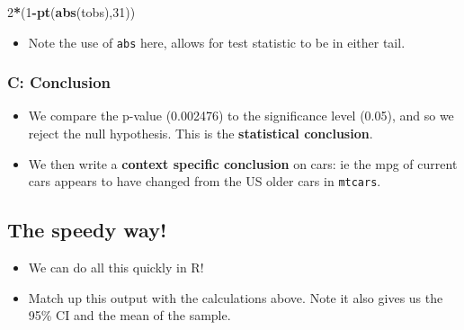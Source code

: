\documentclass[]{article}
\newenvironment{Shaded}{\begin{snugshade}}{\end{snugshade}}
\newcommand{\DataTypeTok}[1]{\textcolor[rgb]{0.13,0.29,0.53}{#1}}
\newcommand{\DecValTok}[1]{\textcolor[rgb]{0.00,0.00,0.81}{#1}}
\newcommand{\FloatTok}[1]{\textcolor[rgb]{0.00,0.00,0.81}{#1}}
\newcommand{\KeywordTok}[1]{\textcolor[rgb]{0.13,0.29,0.53}{\textbf{#1}}}
\newcommand{\NormalTok}[1]{#1}
\newcommand{\OperatorTok}[1]{\textcolor[rgb]{0.81,0.36,0.00}{\textbf{#1}}}
\providecommand{\tightlist}{%
  \setlength{\itemsep}{0pt}\setlength{\parskip}{0pt}}
\begin{document}
\begin{Shaded}
\begin{Highlighting}[]
\DecValTok{2}\OperatorTok{*}\NormalTok{(}\DecValTok{1}\OperatorTok{-}\KeywordTok{pt}\NormalTok{(}\KeywordTok{abs}\NormalTok{(tobs),}\DecValTok{31}\NormalTok{))}
\end{Highlighting}
\end{Shaded}

\begin{itemize}
\tightlist
\item
  Note the use of \texttt{abs} here, allows for test statistic to be in either tail.
\end{itemize}

\hypertarget{c-conclusion}{%
\subsubsection{C: Conclusion}\label{c-conclusion}}

\begin{itemize}
\tightlist
\item
  We compare the p-value (0.002476) to the significance level (0.05), and so we reject the null hypothesis. This is the \textbf{statistical conclusion}.
\item
  We then write a \textbf{context specific conclusion} on cars: ie the mpg of current cars appears to have changed from the US older cars in \texttt{mtcars}.
\end{itemize}

\hypertarget{the-speedy-way}{%
\subsection{The speedy way!}\label{the-speedy-way}}

\begin{itemize}
\tightlist
\item
  We can do all this quickly in R!
\end{itemize}

\begin{Shaded}
\end{Shaded}

\begin{itemize}
\tightlist
\item
  Match up this output with the calculations above. Note it also gives us the 95\% CI and the mean of the sample.
\end{itemize}
\end{document}
